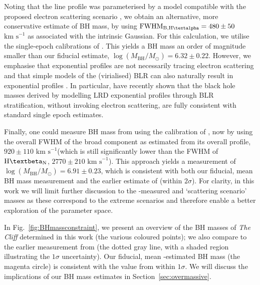 \documentclass[fleqn,usenatbib]{mnras}
\newcommand{\jwst}{\textit{JWST}\xspace}
\newcommand{\Halpha}{\text{H\textalpha}\xspace}
\newcommand{\Hbeta}{\text{H\textbeta}\xspace}
\newcommand{\kms}{\ensuremath{\text{km s}^{-1}}\xspace}
\newcommand{\cliff}{\textit{The Cliff}\xspace}
\begin{document}
 
Noting that the \Halpha line profile was parameterised by a model compatible with the proposed electron scattering scenario \citep{Rusakov2026}, we obtain an alternative, more conservative estimate of BH mass, by using $\mathrm{FWHM}_\mathrm{B, \Halpha}=480\pm50$ \kms as associated with the intrinsic Gaussian. 
For this calculation, we utilise the single-epoch \Halpha calibrations of \cite{ReinesVolonteri2015}. 
This yields a BH mass an order of magnitude smaller than our fiducial estimate, $\log(M_\mathrm{BH}/M_\odot) = 6.32\pm0.22$. 
However, we emphasise that exponential profiles are not necessarily tracing electron scattering and that simple models of the (virialised) BLR can also naturally result in exponential profiles \citep{Scholtz2026_LRD,Madau2026b}. In particular, \citet{Madau2026b} have recently shown that the black hole masses derived by modelling LRD exponential profiles through BLR stratification, without invoking electron scattering, are fully consistent with standard single epoch estimates.

Finally, one could measure BH mass from \Halpha using the calibration of \cite{ReinesVolonteri2015}, now by using the overall FWHM of the broad component as estimated from its overall profile, $920\pm110$ \kms (which is still significantly lower than the FWHM of $\Hbeta_\mathrm{N}$, $2770\pm210$ \kms). This approach yields a measurement of $\log(M_\mathrm{BH}/M_\odot) = 6.91\pm0.23$, which is consistent with both our fiducial, mean \Hbeta BH mass measurement and the earlier estimate of \cite{deGraaff2025} (within $2\sigma$). For clarity, in this work we will limit further discussion to the \Hbeta-measured and \Halpha `scattering scenario' masses as these correspond to the extreme scenarios and therefore enable a better exploration of the parameter space.


In Fig.~\ref{fig:BHmassconstraint}, we present an overview of the BH masses of \cliff determined in this work (the various coloured points); we also compare to the earlier measurement from \cite{deGraaff2025} (the dotted gray line, with a shaded region illustrating the $1\sigma$ uncertainty).
Our fiducial, mean \Hbeta-estimated BH mass (the magenta circle) is consistent with the value from \cite{deGraaff2025} within $1\sigma$. 
We will discuss the implications of our BH mass estimates in Section~\ref{sec:overmassive}.
\end{document}
